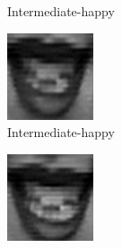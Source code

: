\begin{figure}[H]
\begin{subfigure}[b]{0.15\textwidth}
		\caption{Intermediate-happy}
		\label{fig:timeseriesHappy:e}
	\end{subfigure}
	\begin{subfigure}[b]{0.15\textwidth}
		\includegraphics[width=\textwidth]{./img/timeseriesHappy/S026_006_00000006.png}
		\caption{Intermediate-happy}
		\label{fig:timeseriesHappy:f}
	\end{subfigure}
	\begin{subfigure}[b]{0.15\textwidth}
		\includegraphics[width=\textwidth]{./img/timeseriesHappy/S026_006_00000007.png}

\end{subfigure}
\end{figure}
